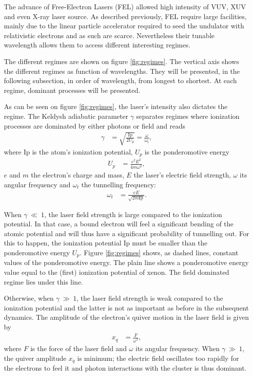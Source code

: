 The advance of Free-Electron Lasers (FEL) allowed high intensity of VUV, XUV and
even X-ray laser source. As described previously, FEL require large facilities,
mainly due to the linear particle accelerator required to seed the undulator
with relativistic electrons and as such are scarce. Nevertheless their
tunable wavelength allows them to access different interesting regimes.

The different regimes are shown on figure \ref{fig:regimes}.
The vertical axis shows the different regimes as
function of wavelengths. They will be presented, in the following subsection,
in order of wavelength, from longest to shortest. At each regime, dominant
processes will be presented.

As can be seen on figure \ref{fig:regimes}, the laser's intensity also dictates
the regime.
The Keldysh adiabatic parameter $\gamma$ separates regimes where ionization
processes are dominated by either photons or field\cite{Long2010} and reads
\begin{align}
\gamma & = \sqrt{ \frac{\textrm{Ip}}{2 U_p} } = \frac{\omega}{\omega_t},
\end{align}
where Ip is the atom's ionization potential, $U_p$ is the ponderomotive energy
\begin{align}
U_p & = \frac{e^2 E^2}{4 m \omega^2},
\end{align}
$e$ and $m$ the electron's charge and mass, $E$ the laser's electric field
strength, $\omega$ its angular frequency and $\omega_t$ the tunnelling
frequency:
\begin{align}
\omega_t & = \frac{e E}{\sqrt{2 m \textrm{Ip}}}.
\end{align}

When $\gamma~\ll~1$, the laser field strength is large compared to the ionization
potential. In that case, a bound electron will feel a significant bending of the
atomic potential and will thus have a significant probability of tunnelling out.
For this to happen, the ionization potential Ip must be
smaller than the ponderomotive energy $U_p$. Figure \ref{fig:regimes} shows,
as dashed lines, constant values of the ponderomotive energy. The plain line shows
a ponderomotive energy value equal to the (first) ionization potential of xenon.
The field dominated regime lies under this line.

Otherwise, when $\gamma~\gg~1$, the laser field strength is weak compared to
the ionization potential and the latter is not as important as before in the
subsequent dynamics. The amplitude of the electron's quiver motion in the laser
field is given by
\begin{align}
x_q & = \frac{F}{\omega^2},
\label{eqn:quiver}
\end{align}
where $F$ is the force of the laser field and $\omega$ its angular frequency.
When $\gamma~\gg~1$, the quiver amplitude $x_q$ is minimum; the electric field
oscillates too rapidly for the electrons to feel it and photon interactions with
the cluster is thus dominant.

